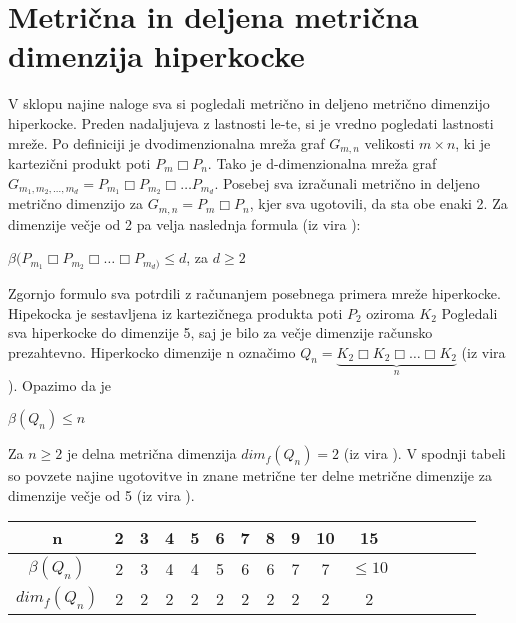 \documentclass[a4paper]{report}
\begin{document}
	\section*{Metrična in deljena metrična dimenzija hiperkocke}
	V sklopu najine naloge sva si pogledali metrično in deljeno metrično dimenzijo hiperkocke. Preden nadaljujeva z lastnosti le-te, si je vredno pogledati lastnosti mreže.
	Po definiciji je dvodimenzionalna mreža graf $G_{m,n}$ velikosti $m\times n$, ki je kartezični produkt poti $P_{m}\Box P_{n}$. Tako je d-dimenzionalna mreža graf $G_{m_{1},m_{2},\dots,m_{d}} = P_{m_{1}}\Box P_{m_{2}}\Box \dots P_{m_{d}}$. Posebej sva izračunali metrično in deljeno metrično dimenzijo za  $G_{m,n}=P_{m}\Box P_{n}$, kjer sva ugotovili, da sta obe enaki 2. Za dimenzije večje od 2 pa velja naslednja formula (iz vira \cite{3}): \\
	\begin{center}
		$\beta(P_{m_{1}}\Box P_{m_{2}}\Box \dots \Box P_{m_{d})} \le d$, za $d\ge 2$
	\end{center}
	Zgornjo formulo sva potrdili z računanjem posebnega primera mreže hiperkocke. Hipekocka je sestavljena iz kartezičnega produkta poti $P_{2}$ oziroma $K_{2}$ Pogledali sva  hiperkocke do dimenzije 5, saj je bilo za večje dimenzije računsko prezahtevno. Hiperkocko dimenzije n označimo $Q_{n} = \underbrace{K_{2} \Box K_{2}\Box \dots \Box K_{2}}_{n}$ (iz vira \cite{4}). Opazimo da je
	\begin{center}
		$\beta(Q_{n})\le n$
	\end{center}
	Za $n \ge 2$ je delna metrična dimenzija $dim_{f}(Q_{n}) = 2$ (iz vira \cite{2}). 
	V spodnji tabeli so povzete najine ugotovitve in znane metrične ter delne metrične dimenzije za dimenzije večje od 5 (iz vira \cite{3}).
	
	
	\begin{center}
		\begin{tabular}{|c||c|c|c|c|c|c|c|c|c|c|c|c|c|c|c}
			\hline
			\hline
			n&2&3&4&5&6&7&8&9&10&15\\
			\hline
			$\beta(Q_{n})$&2&3&4&4&5&6&6&7&7& $\le 10$ \\
			\hline
			$dim_{f}(Q_{n})$&2&2&2&2&2&2&2&2&2&2\\
			\hline
			\hline
		\end{tabular}
	\end{center}
\end{document}
